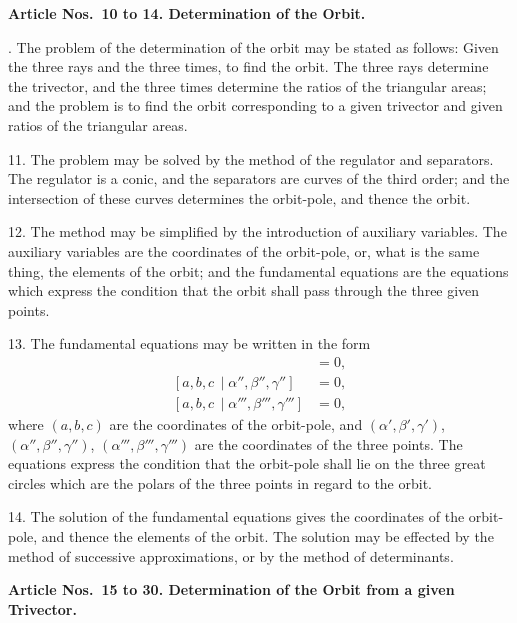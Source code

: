 \documentclass[11pt,a4paper]{article}
\theoremstyle{definition}
\begin{document}
\noindent
\textbf{Article Nos.~10 to 14. Determination of the Orbit.}

\smallskip

. The problem of the determination of the orbit may be stated as follows: Given
the three rays and the three times, to find the orbit. The three rays determine the
trivector, and the three times determine the ratios of the triangular areas; and the
problem is to find the orbit corresponding to a given trivector and given ratios of the
triangular areas.

11. The problem may be solved by the method of the regulator and separators. The
regulator is a conic, and the separators are curves of the third order; and the intersection
of these curves determines the orbit-pole, and thence the orbit.

12. The method may be simplified by the introduction of auxiliary variables. The
auxiliary variables are the coordinates of the orbit-pole, or, what is the same thing, the
elements of the orbit; and the fundamental equations are the equations which express the
condition that the orbit shall pass through the three given points.

13. The fundamental equations may be written in the form
\begin{align*}
[a,b,c\,\mid\alpha',\beta',\gamma'] &= 0, \\
[a,b,c\,\mid\alpha'',\beta'',\gamma''] &= 0, \\
[a,b,c\,\mid\alpha''',\beta''',\gamma'''] &= 0,
\end{align*}
where $(a,b,c)$ are the coordinates of the orbit-pole, and $(\alpha',\beta',\gamma')$, $(\alpha'',\beta'',\gamma'')$,
$(\alpha''',\beta''',\gamma''')$ are the coordinates of the three points. The equations express the
condition that the orbit-pole shall lie on the three great circles which are the polars of
the three points in regard to the orbit.

14. The solution of the fundamental equations gives the coordinates of the orbit-pole,
and thence the elements of the orbit. The solution may be effected by the method of
successive approximations, or by the method of determinants.

\newpage
\noindent
\textbf{Article Nos.~15 to 30. Determination of the Orbit from a given Trivector.}

\smallskip
\end{document}
